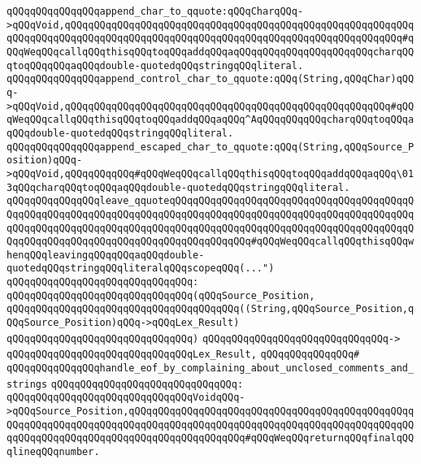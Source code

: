 \verb|qQQqqQQqqQQqqQQqappend_char_to_qquote:qQQqCharqQQq->qQQqVoid,qQQqqQQqqQQqqQQqqQQqqQQqqQQqqQQqqQQqqQQqqQQqqQQqqQQqqQQqqQQqqQQqqQQqqQQqqQQqqQQqqQQqqQQqqQQqqQQqqQQqqQQqqQQqqQQqqQQqqQQqqQQqqQQq#qQQqWeqQQqcallqQQqthisqQQqtoqQQqaddqQQqaqQQqqQQqqQQqqQQqqQQqqQQqcharqQQqtoqQQqqQQqaqQQqdouble-quotedqQQqstringqQQqliteral.|\newline
\verb|qQQqqQQqqQQqqQQqappend_control_char_to_qquote:qQQq(String,qQQqChar)qQQq->qQQqVoid,qQQqqQQqqQQqqQQqqQQqqQQqqQQqqQQqqQQqqQQqqQQqqQQqqQQqqQQq#qQQqWeqQQqcallqQQqthisqQQqtoqQQqaddqQQqaqQQq^AqQQqqQQqqQQqcharqQQqtoqQQqaqQQqdouble-quotedqQQqstringqQQqliteral.|\newline
\verb|qQQqqQQqqQQqqQQqappend_escaped_char_to_qquote:qQQq(String,qQQqSource_Position)qQQq->qQQqVoid,qQQqqQQqqQQq#qQQqWeqQQqcallqQQqthisqQQqtoqQQqaddqQQqaqQQq\013qQQqcharqQQqtoqQQqaqQQqdouble-quotedqQQqstringqQQqliteral.|\newline
\verb|qQQqqQQqqQQqqQQqleave_qquoteqQQqqQQqqQQqqQQqqQQqqQQqqQQqqQQqqQQqqQQqqQQqqQQqqQQqqQQqqQQqqQQqqQQqqQQqqQQqqQQqqQQqqQQqqQQqqQQqqQQqqQQqqQQqqQQqqQQqqQQqqQQqqQQqqQQqqQQqqQQqqQQqqQQqqQQqqQQqqQQqqQQqqQQqqQQqqQQqqQQqqQQqqQQqqQQqqQQqqQQqqQQqqQQqqQQqqQQqqQQqqQQq#qQQqWeqQQqcallqQQqthisqQQqwhenqQQqleavingqQQqqQQqaqQQqdouble-quotedqQQqstringqQQqliteralqQQqscopeqQQq(...")|\newline
\verb|qQQqqQQqqQQqqQQqqQQqqQQqqQQqqQQq:|\newline
\verb|qQQqqQQqqQQqqQQqqQQqqQQqqQQqqQQq(qQQqSource_Position,|\newline
\verb|qQQqqQQqqQQqqQQqqQQqqQQqqQQqqQQqqQQqqQQq((String,qQQqSource_Position,qQQqSource_Position)qQQq->qQQqLex_Result)|\newline
\verb|qQQqqQQqqQQqqQQqqQQqqQQqqQQqqQQq)|\newline
\verb|qQQqqQQqqQQqqQQqqQQqqQQqqQQqqQQq->|\newline
\verb|qQQqqQQqqQQqqQQqqQQqqQQqqQQqqQQqLex_Result,|\newline
\verb|qQQqqQQqqQQqqQQq#|\newline
\verb|qQQqqQQqqQQqqQQqhandle_eof_by_complaining_about_unclosed_comments_and_strings|\newline
\verb|qQQqqQQqqQQqqQQqqQQqqQQqqQQqqQQq:|\newline
\verb|qQQqqQQqqQQqqQQqqQQqqQQqqQQqqQQqVoidqQQq->qQQqSource_Position,qQQqqQQqqQQqqQQqqQQqqQQqqQQqqQQqqQQqqQQqqQQqqQQqqQQqqQQqqQQqqQQqqQQqqQQqqQQqqQQqqQQqqQQqqQQqqQQqqQQqqQQqqQQqqQQqqQQqqQQqqQQqqQQqqQQqqQQqqQQqqQQqqQQqqQQqqQQqqQQq#qQQqWeqQQqreturnqQQqfinalqQQqlineqQQqnumber.|\newline

